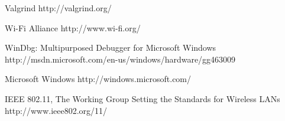 \begin{thebibliography}{9}
		{Valgrind}
		{http://valgrind.org/}

		{Wi-Fi Alliance}
		{http://www.wi-fi.org/}

		{WinDbg: Multipurposed Debugger for Microsoft Windows}
		{http://msdn.microsoft.com/en-us/windows/hardware/gg463009}

		{Microsoft Windows}
		{http://windows.microsoft.com/}

		{IEEE 802.11, The Working Group Setting the Standards for Wireless LANs}
		{http://www.ieee802.org/11/}

\end{thebibliography}